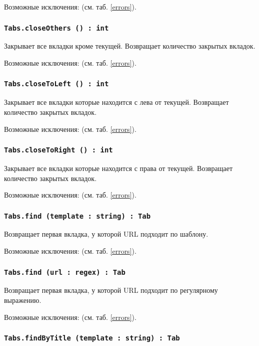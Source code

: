 Возможные исключения:  (см. таб. \ref{errors}).

\subsubsection{\texttt{Tabs.closeOthers () : int}}

Закрывает все вкладки кроме текущей. Возвращает количество закрытых вкладок.

Возможные исключения:  (см. таб. \ref{errors}).

\subsubsection{\texttt{Tabs.closeToLeft () : int}}

Закрывает все вкладки которые находится с лева от текущей. Возвращает количество закрытых вкладок.

Возможные исключения:  (см. таб. \ref{errors}).

\subsubsection{\texttt{Tabs.closeToRight () : int}}

Закрывает все вкладки которые находится с права от текущей. Возвращает количество закрытых вкладок.

Возможные исключения:  (см. таб. \ref{errors}).

\subsubsection{\texttt{Tabs.find (template : string) : Tab}}

Возвращает первая вкладка, у которой URL подходит по шаблону.

Возможные исключения:  (см. таб. \ref{errors}).

\subsubsection{\texttt{Tabs.find (url : regex) : Tab}}

Возвращает первая вкладка, у которой URL подходит по регулярному выражению.

Возможные исключения:  (см. таб. \ref{errors}).

\subsubsection{\texttt{Tabs.findByTitle (template : string) : Tab}}

